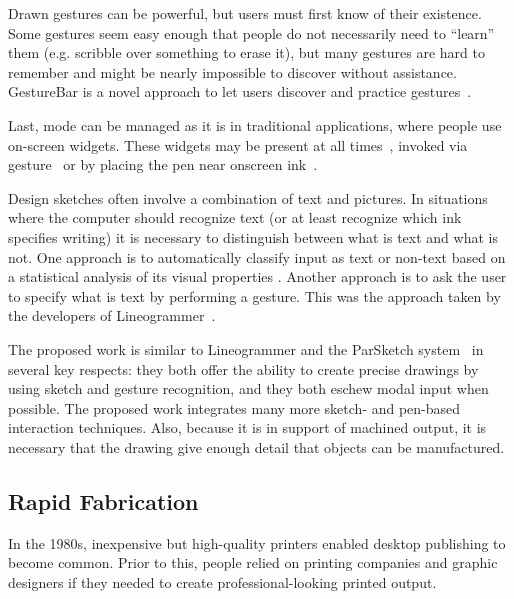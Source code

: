 \documentclass[12pt]{article}
\begin{document}
Drawn gestures can be powerful, but users must first know of their
existence. Some gestures seem easy enough that people do not
necessarily need to ``learn'' them (e.g. scribble over something to
erase it), but many gestures are hard to remember and might be nearly
impossible to discover without assistance. GestureBar is a novel
approach to let users discover and practice
gestures~\cite{bragdon-gesturebar}.

Last, mode can be managed as it is in traditional applications, where
people use on-screen widgets. These widgets may be present at all
times~\cite{forbus-nusketch-battlespace}, invoked via
gesture~\cite{grossman-hover-widgets,kurtenbach-marking-menus} or by
placing the pen near onscreen
ink~\cite{marinkas-shadowbutton,grossman-handle-flag}.

Design sketches often involve a combination of text and pictures. In
situations where the computer should recognize text (or at least
recognize which ink specifies writing) it is necessary to distinguish
between what is text and what is not. One approach is to automatically
classify input as text or non-text based on a statistical analysis of
its visual properties \cite{patel-detect-text}. Another approach is to
ask the user to specify what is text by performing a gesture. This was
the approach taken by the developers of
Lineogrammer~\cite{zeleznik-lineogrammer}.

The proposed work is similar to Lineogrammer and the ParSketch
system~\cite{company-sketching-in-engineering,naya-parsketch} in
several key respects: they both offer the ability to create precise
drawings by using sketch and gesture recognition, and they both eschew
modal input when possible. The proposed work integrates many more
sketch- and pen-based interaction techniques. Also, because it is in
support of machined output, it is necessary that the drawing give
enough detail that objects can be manufactured.

\subsection{Rapid Fabrication}

In the 1980s, inexpensive but high-quality printers enabled desktop
publishing to become common. Prior to this, people relied on printing
companies and graphic designers if they needed to create
professional-looking printed output. 

%
\end{document}
